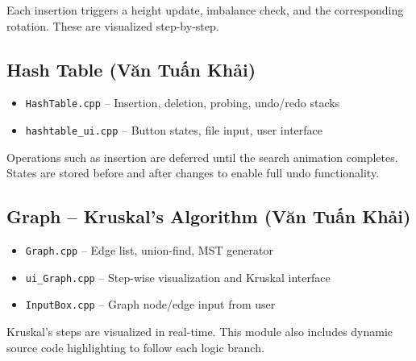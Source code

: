 \begin{flushleft}
Each insertion triggers a height update, imbalance check, and the corresponding rotation. These are visualized step-by-step.
\subsection*{Hash Table (Văn Tuấn Khải)}

\begin{itemize}
    \item \texttt{HashTable.cpp} – Insertion, deletion, probing, undo/redo stacks
    \item \texttt{hashtable\_ui.cpp} – Button states, file input, user interface
\end{itemize}

Operations such as insertion are deferred until the search animation completes. States are stored before and after changes to enable full undo functionality.



\subsection*{Graph – Kruskal’s Algorithm (Văn Tuấn Khải)}

\begin{itemize}
    \item \texttt{Graph.cpp} – Edge list, union-find, MST generator
    \item \texttt{ui\_Graph.cpp} – Step-wise visualization and Kruskal interface
    \item \texttt{InputBox.cpp} – Graph node/edge input from user
\end{itemize}

Kruskal’s steps are visualized in real-time. This module also includes dynamic source code highlighting to follow each logic branch.
\end{flushleft}